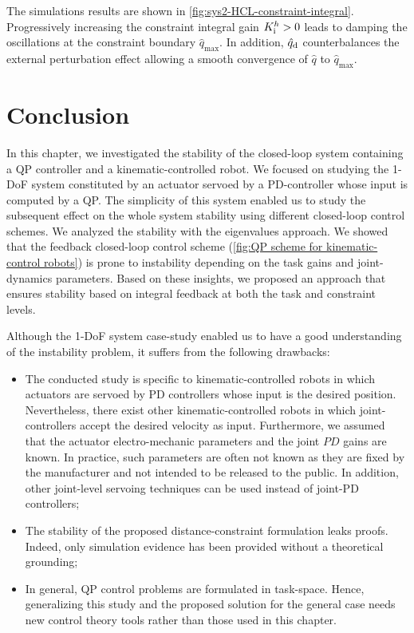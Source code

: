 The simulations results are shown in \cref{fig:sys2-HCL-constraint-integral}. 
Progressively increasing the constraint integral gain $K_{\rm i}^h>0$ leads to damping the oscillations at the constraint boundary $\hat{q}_{\max}$. In addition, $\hat{q}_{\rm d}$ counterbalances the external perturbation effect allowing a smooth convergence of $\hat{q}$ to $\hat{q}_{\max}$.
\section{Conclusion}
In this chapter, we investigated the stability of the closed-loop system containing a QP controller and a kinematic-controlled robot. We focused on studying the 1-DoF system constituted by an actuator servoed by a PD-controller whose input is computed by a QP. %
The simplicity of this system enabled us to study the subsequent effect on the whole system stability using different closed-loop control schemes. We analyzed the stability with the eigenvalues approach. We showed that the feedback closed-loop control scheme (\cref{fig:QP scheme for kinematic-control robots}) is prone to instability depending on the task gains and joint-dynamics parameters. Based on these insights, we proposed an approach that ensures stability based on integral feedback at both the task and constraint levels. 

Although the 1-DoF system case-study enabled us to have a good understanding of the instability problem, it suffers from the following drawbacks:
\begin{itemize}
	\item The conducted study is specific to kinematic-controlled robots in which actuators are servoed by PD controllers whose input is the desired position. Nevertheless, there exist other kinematic-controlled robots in which joint-controllers accept the desired velocity as input. Furthermore, we assumed that the actuator electro-mechanic parameters and the joint $PD$ gains are known. In practice, such parameters are often not known as they are fixed by the manufacturer and not intended to be released to the public. In addition, other joint-level servoing techniques can be used instead of joint-PD controllers;
	\item The stability of the proposed distance-constraint formulation leaks proofs. Indeed, only simulation evidence has been provided without a theoretical grounding;
	\item In general, QP control problems are formulated in task-space. Hence, generalizing this study and the proposed solution for the general case needs new control theory tools rather than those used in this chapter.   
\end{itemize}

